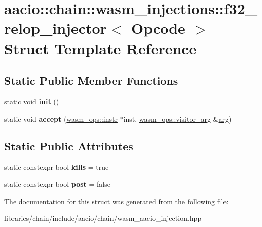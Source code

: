 \hypertarget{structaacio_1_1chain_1_1wasm__injections_1_1f32__relop__injector}{}\section{aacio\+:\+:chain\+:\+:wasm\+\_\+injections\+:\+:f32\+\_\+relop\+\_\+injector$<$ Opcode $>$ Struct Template Reference}
\label{structaacio_1_1chain_1_1wasm__injections_1_1f32__relop__injector}
\subsection*{Static Public Member Functions}
\begin{DoxyCompactItemize}
\item 
\mbox{\label{structaacio_1_1chain_1_1wasm__injections_1_1f32__relop__injector_a3382cda42e3375611f8bcb87944b55c1}} 
static void {\bfseries init} ()
\item 
\mbox{\label{structaacio_1_1chain_1_1wasm__injections_1_1f32__relop__injector_a8e0fc9500a8ca2c4c3e09037b464a6f3}} 
static void {\bfseries accept} (\mbox{\hyperlink{structaacio_1_1chain_1_1wasm__ops_1_1instr}{wasm\+\_\+ops\+::instr}} $\ast$inst, \mbox{\hyperlink{structaacio_1_1chain_1_1wasm__ops_1_1visitor__arg}{wasm\+\_\+ops\+::visitor\+\_\+arg}} \&\mbox{\hyperlink{unionarg}{arg}})
\end{DoxyCompactItemize}
\subsection*{Static Public Attributes}
\begin{DoxyCompactItemize}
\item 
\mbox{\label{structaacio_1_1chain_1_1wasm__injections_1_1f32__relop__injector_ae216236da0bb2c9db231e82421805f6c}} 
static constexpr bool {\bfseries kills} = true
\item 
\mbox{\label{structaacio_1_1chain_1_1wasm__injections_1_1f32__relop__injector_a06748a603d38fbb1341d2a890b5794fe}} 
static constexpr bool {\bfseries post} = false
\end{DoxyCompactItemize}


The documentation for this struct was generated from the following file\+:\begin{DoxyCompactItemize}
\item 
libraries/chain/include/aacio/chain/wasm\+\_\+aacio\+\_\+injection.\+hpp\end{DoxyCompactItemize}
